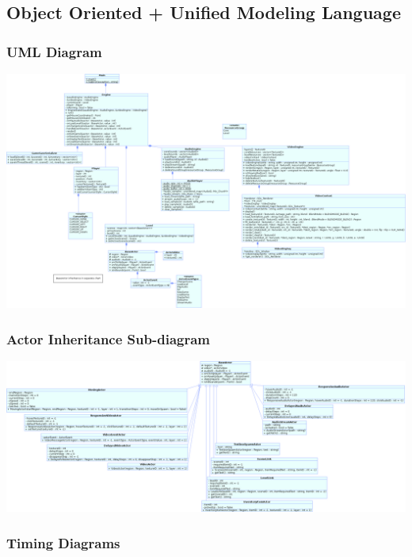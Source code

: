 \documentclass{article}
\begin{document}
	\subsection{Object Oriented + Unified Modeling Language}
		\subsubsection{UML Diagram}
			\begin{center}
				\includegraphics[scale=0.31,angle=90]{MainClasses.png}
			\end{center}
		\subsubsection{Actor Inheritance Sub-diagram}
			\begin{center}
				\includegraphics[scale=0.35,angle=90]{Actors.png}
			\end{center}
		\subsubsection{Timing Diagrams}
\end{document}
